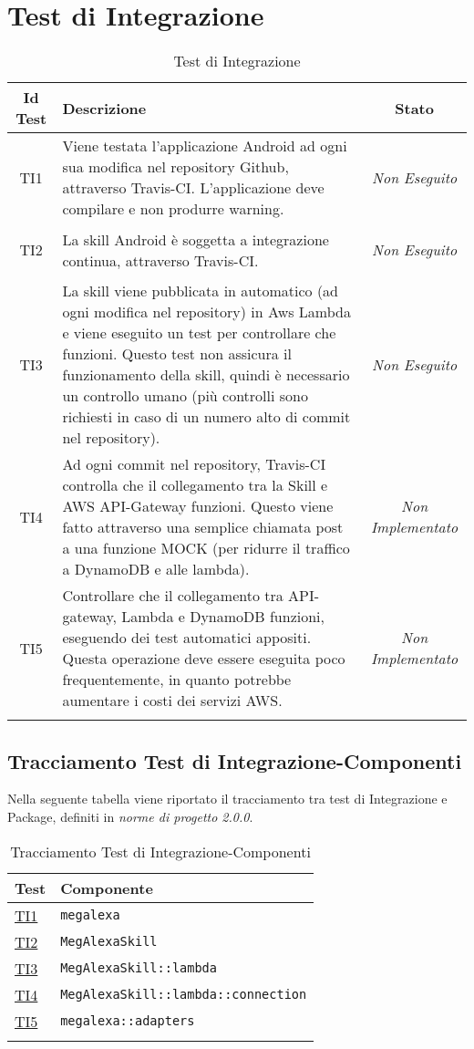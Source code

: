 \section{Test di Integrazione}
\normalsize
\begin{longtable}{|c|>{}m{8cm}|c|}
\hline 
\textbf{Id Test} & \textbf{Descrizione} & \textbf{Stato}\\
\hline
\endhead
\hypertarget{TI1}{TI1} & Viene testata l'applicazione Android ad ogni sua modifica nel repository Github, attraverso Travis-CI. L'applicazione deve compilare e non produrre warning. & \textit{Non Eseguito}\\ \hline
\hypertarget{TI2}{TI2} & La skill Android è soggetta a integrazione continua, attraverso Travis-CI. & \textit{Non Eseguito}\\ \hline
\hypertarget{TI3}{TI3} & La skill viene pubblicata in automatico (ad ogni modifica nel repository) in Aws Lambda e viene eseguito un test per controllare che funzioni. Questo test non assicura il funzionamento della skill, quindi è necessario un controllo umano (più controlli sono richiesti in caso di un numero alto di commit nel repository). & \textit{Non Eseguito}\\ \hline
\hypertarget{TI4}{TI4} & Ad ogni commit nel repository, Travis-CI controlla che il collegamento tra la Skill e AWS API-Gateway funzioni. Questo viene fatto attraverso una semplice chiamata post a una funzione MOCK (per ridurre il traffico a DynamoDB e alle lambda). & \textit{Non Implementato}\\ \hline
\hypertarget{TI5}{TI5} & Controllare che il collegamento tra API-gateway, Lambda e DynamoDB funzioni, eseguendo dei test automatici appositi. Questa operazione deve essere eseguita poco frequentemente, in quanto potrebbe aumentare i costi dei servizi AWS. & \textit{Non Implementato}\\ \hline
\caption[Test di Integrazione]{Test di Integrazione}
\label{tabella:test2}
\end{longtable}

\subsection{Tracciamento Test di Integrazione-Componenti}
Nella seguente tabella viene riportato il tracciamento tra test di Integrazione e Package, definiti in \textit{norme di progetto 2.0.0}.
\normalsize
\begin{longtable}{|>{\centering}m{3cm}|m{9cm}<{\centering}|}
\hline
\textbf{Test} & \textbf{Componente}\\
\hline
\endhead
\hyperlink{TI1}{TI1} & \texttt{megalexa}\\ \hline
\hyperlink{TI2}{TI2} & {\texttt{MegAlexaSkill}}\\ \hline
\hyperlink{TI3}{TI3} & {\texttt{MegAlexaSkill::lambda}}\\ \hline
\hyperlink{TI4}{TI4} & {\texttt{MegAlexaSkill::lambda::connection}}\\ \hline
\hyperlink{TI5}{TI5} & {\texttt{megalexa::adapters}}\\ \hline
\caption[Tracciamento Test di Integrazione-Componenti]{Tracciamento Test di Integrazione-Componenti}
\label{tabella:ts-requi}
\end{longtable}

